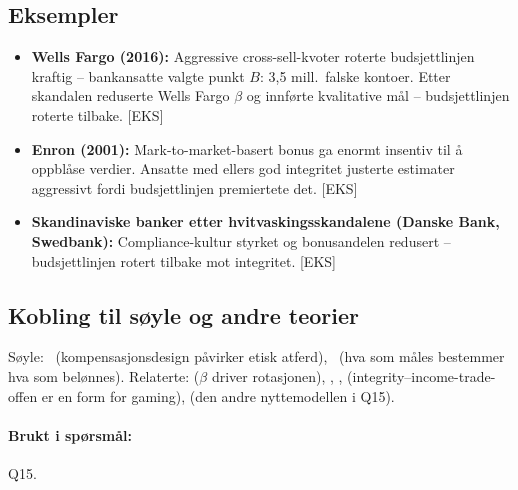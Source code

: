 \subsection*{Eksempler}
\begin{itemize}\setlength{\itemsep}{2pt}
\item \textbf{Wells Fargo (2016):} Aggressive cross-sell-kvoter roterte budsjettlinjen kraftig -- bankansatte valgte punkt $B$: 3{,}5 mill.\ falske kontoer. Etter skandalen reduserte Wells Fargo $\beta$ og innførte kvalitative mål -- budsjettlinjen roterte tilbake. [EKS]
\item \textbf{Enron (2001):} Mark-to-market-basert bonus ga enormt insentiv til å oppblåse verdier. Ansatte med ellers god integritet justerte estimater aggressivt fordi budsjettlinjen premiertete det. [EKS]
\item \textbf{Skandinaviske banker etter hvitvaskingsskandalene (Danske Bank, Swedbank):} Compliance-kultur styrket og bonusandelen redusert -- budsjettlinjen rotert tilbake mot integritet. [EKS]
\end{itemize}

\subsection*{Kobling til søyle og andre teorier}
Søyle: \SThree\ (kompensasjonsdesign påvirker etisk atferd), \STwo\ (hva som måles bestemmer hva som belønnes). Relaterte:  ($\beta$ driver rotasjonen), , ,  (integrity--income-trade-offen er en form for gaming),  (den andre nyttemodellen i Q15).

\paragraph{Brukt i spørsmål:} Q15.

